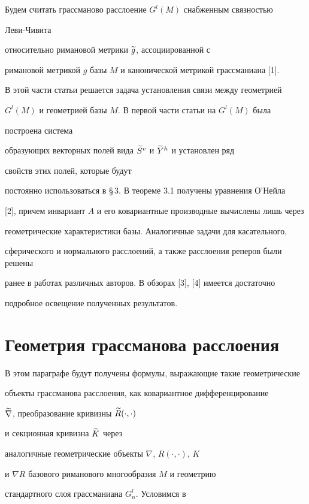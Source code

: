 Будем считать грассманово расслоение $G^l(M)$ снабженным связностью 


Леви-Чивита


относительно римановой метрики $\widetilde {g}$, ассоциированной с


римановой метрикой $g$ базы $M$ и канонической метрикой грассманиана [1].


В этой части статьи решается задача установления связи между геометрией


$G^l(M)$ и геометрией базы $M$. В первой части статьи на $G^l(M)$ была


построена система


образующих векторных полей вида $\widetilde {S}{}^v$ и $\widetilde {Y}{}^h$ и установлен ряд


свойств этих полей, которые будут


постоянно использоваться в \S\,3. В теореме 3.1 получены уравнения О'Нейла


[2], причем инвариант $A$ и его ковариантные производные вычислены лишь через


геометрические характеристики базы. Аналогичные задачи для касательного,


сферического и нормального расслоений, а также расслоения реперов были решены


ранее в работах различных авторов. В обзорах [3], [4] имеется достаточно


подробное освещение полученных результатов.





\section{Геометрия грассманова расслоения}





В этом параграфе будут получены формулы, выражающие такие геометрические


объекты грассманова расслоения, как ковариантное дифференцирование


$\widetilde {\nabla}$, преобразование кривизны $\widetilde {R}(\cdot,\cdot)$


и секционная кривизна $\widetilde {K}$ через


аналогичные геометрические объекты $\nabla$, $R(\cdot,\cdot)$, $K$


и $\nabla R$ базового риманового многообразия $M$ и геометрию


стандартного слоя грассманиана $G^l_n$. Условимся в


